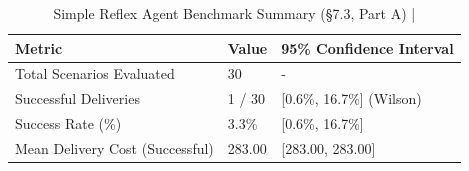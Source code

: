 \begin{table}[htbp]
\centering
\caption{Simple Reflex Agent Benchmark Summary (§7.3, Part A) | \stampline}
\label{tab:partA_reflex}
\begin{tabular}{lll}
\toprule
Metric & Value & 95\% Confidence Interval \\
\midrule
Total Scenarios Evaluated & 30 & - \\
Successful Deliveries & 1 / 30 & [0.6\%, 16.7\%] (Wilson) \\
Success Rate (\%) & 3.3\% & [0.6\%, 16.7\%] \\
Mean Delivery Cost (Successful) & 283.00 & [283.00, 283.00] \\
\bottomrule
\end{tabular}

\end{table}

